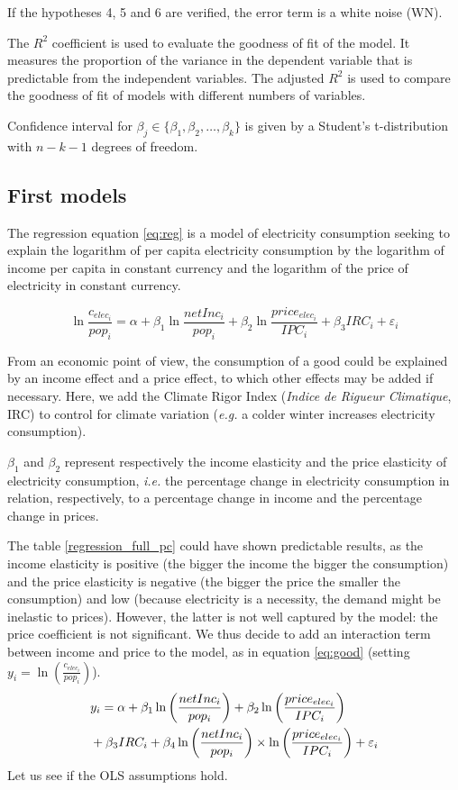 If the hypotheses 4, 5 and 6 are verified, the error term is a white noise (WN). 

The $R^2$ coefficient is used to evaluate the goodness of fit of the model. It measures the proportion of the variance in the dependent variable that is predictable from the independent variables. The adjusted $R^2$ is used to compare the goodness of fit of models with different numbers of variables.

Confidence interval for $\beta_j \in \{\beta_1, \beta_2, \ldots, \beta_k\}$ is given by a Student's t-distribution with $n - k - 1$ degrees of freedom.

\subsection{First models}
The regression equation \eqref{eq:reg} is a model of electricity consumption seeking to explain the logarithm of per capita electricity consumption by the logarithm of income per capita in constant currency and the logarithm of the price of electricity in constant currency. 

\begin{equation} \label{eq:reg}
\ln{\frac{c_{elec_i}}{pop_i}} = \alpha + \beta_1 \ln{\frac{{netInc_i}}{pop_i}} + \beta_2 \ln{\frac{price_{elec_i}}{IPC_i}} + \beta_3 IRC_i + \varepsilon_i
\end{equation}

From an economic point of view, the consumption of a good could be explained by an income effect and a price effect, to which other effects may be added if necessary. Here, we add the Climate Rigor Index (\textit{Indice de Rigueur Climatique}, IRC) to control for climate variation (\textit{e.g.} a colder winter increases electricity consumption).

$\beta_1$ and $\beta_2$ represent respectively the income elasticity and the price elasticity of electricity consumption, \textit{i.e.} the percentage change in electricity consumption in relation, respectively, to a percentage change in income and the percentage change in prices. 

The table \ref{regression_full_pc} could have shown predictable results, as the income elasticity is positive (the bigger the income the bigger the consumption) and the price elasticity is negative (the bigger the price the smaller the consumption) and low (because electricity is a necessity, the demand might be inelastic to prices). However, the latter is not well captured by the model: the price coefficient is not significant. We thus decide to add an interaction term between income and price to the model, as in equation \eqref{eq:good} (setting $y_i = \ln{\left(\frac{c_{elec_i}}{pop_i}\right)}$). 
\begin{align} \label{eq:good}
    &y_i = \alpha + \beta_1 \ln{\left(\frac{{netInc_i}}{pop_i}\right)} + \beta_2 \ln{\left(\frac{price_{elec_i}}{IPC_i}\right)} \notag \\
    &+ \beta_3 IRC_i + \beta_4 \ln{\left(\frac{{netInc_i}}{pop_i}\right)} \times \ln{\left(\frac{price_{elec_i}}{IPC_i}\right)} + \varepsilon_i
\end{align}
Let us see if the OLS assumptions hold. 

